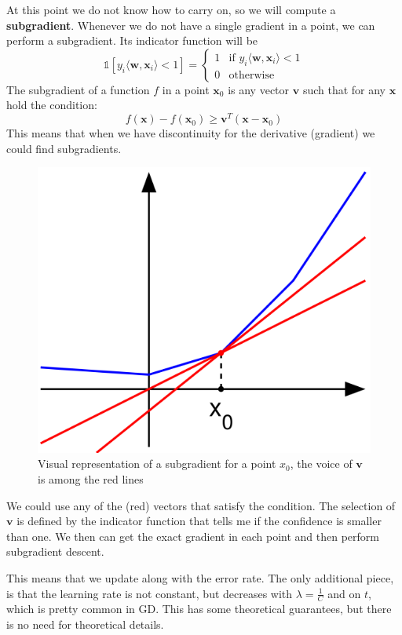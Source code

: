     At this point we do not know how to carry on, so we will compute a \textbf{subgradient}. 
    Whenever we do not have a single gradient in a point, we can perform a subgradient. Its indicator function will be
    \[
        \mathbb{1} [y_i \langle \pmb{w}, \pmb{x}_i \rangle < 1] =
    \begin{cases}
        1               & \text{if } y_i \langle \pmb{w}, \pmb{x}_i \rangle < 1 \\
        0               & \text{otherwise}
    \end{cases}
    \]
    The subgradient of a function $f$ in a point $\pmb{x}_0$ is any vector $\pmb{v}$ such that for any $\pmb{x}$ hold the condition:
    $$f(\pmb{x}) - f(\pmb{x}_0) \geq \pmb{v}^T (\pmb{x} - \pmb{x}_0)$$
    This means that when we have discontinuity for the derivative (gradient) we could find subgradients. 
    \begin{figure} 
        \centering
        \includegraphics[scale = 0.3]{images/subgradient.png}
        \caption{Visual representation of a subgradient for a point $x_0$, the voice of $\pmb{v}$ is among the red lines}
        \label{fig:subgradient}
    \end{figure}
    We could use any of the (red) vectors that satisfy the condition. 
    The selection of $\pmb{v}$ is defined by the indicator function that tells me if the confidence is smaller than one.
    We then can get the exact gradient in each point and then perform subgradient descent.

    This means that we update along with the error rate. The only additional piece, is that the learning rate is not constant, but decreases with $\lambda = \frac{1}{C}$ and on $t$, which is pretty common in GD. 
    This has some theoretical guarantees, but there is no need for theoretical details.\\
